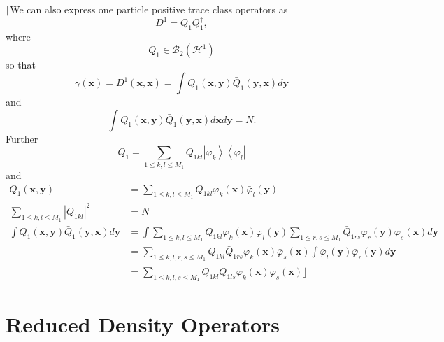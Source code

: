 \documentclass[aps,preprint]{revtex4}%
\begin{document}
$\lceil$We can also express one particle positive trace class operators as
\begin{equation}
D^{1}=Q_{1}Q_{1}^{\dagger},
\end{equation}
where
\begin{equation}
Q_{1}\in\mathcal{B}_{2}\left(  \mathcal{H}^{1}\right)
\end{equation}
so that
\begin{equation}
\gamma\left(  \mathbf{x}\right)  =D^{1}\left(  \mathbf{x,x}\right)  =\int
Q_{1}\left(  \mathbf{x,y}\right)  \bar{Q}_{1}\left(  \mathbf{y,x}\right)
d\mathbf{y}%
\end{equation}
and
\begin{equation}
\int Q_{1}\left(  \mathbf{x,y}\right)  \bar{Q}_{1}\left(  \mathbf{y,x}\right)
d\mathbf{x}d\mathbf{y}=N\mathbf{.}%
\end{equation}
Further
\begin{equation}
Q_{1}=\sum_{1\leq k,l\leq M_{1}}Q_{1kl}\left\vert \varphi_{k}\right\rangle
\left\langle \varphi_{l}\right\vert
\end{equation}
and
\begin{align}
Q_{1}\left(  \mathbf{x,y}\right)   &  =\sum_{1\leq k,l\leq M_{1}}%
Q_{1kl}\varphi_{k}\left(  \mathbf{x}\right)  \bar{\varphi}_{l}\left(
\mathbf{y}\right)  \\
\sum_{1\leq k,l\leq M_{1}}\left\vert Q_{1kl}\right\vert ^{2} &  =N\nonumber\\
\int Q_{1}\left(  \mathbf{x,y}\right)  \bar{Q}_{1}\left(  \mathbf{y,x}\right)
d\mathbf{y} &  \mathbf{=}\int\sum_{1\leq k,l\leq M_{1}}Q_{1kl}\varphi
_{k}\left(  \mathbf{x}\right)  \bar{\varphi}_{l}\left(  \mathbf{y}\right)
\sum_{1\leq r,s\leq M_{1}}\bar{Q}_{1rs}\bar{\varphi}_{r}\left(  \mathbf{y}%
\right)  \bar{\varphi}_{s}\left(  \mathbf{x}\right)  d\mathbf{y}\\
&  =\sum_{1\leq k,l,r,s\leq M_{1}}Q_{1kl}\bar{Q}_{1rs}\varphi_{k}\left(
\mathbf{x}\right)  \bar{\varphi}_{s}\left(  \mathbf{x}\right)  \int
\bar{\varphi}_{l}\left(  \mathbf{y}\right)  \bar{\varphi}_{r}\left(
\mathbf{y}\right)  d\mathbf{y}\\
&  =\sum_{1\leq k,l,s\leq M_{1}}Q_{1kl}\bar{Q}_{1ls}\varphi_{k}\left(
\mathbf{x}\right)  \bar{\varphi}_{s}\left(  \mathbf{x}\right)  \rfloor
\end{align}


\appendix

\section{Reduced Density Operators \label{Denmat}}
\end{document}
